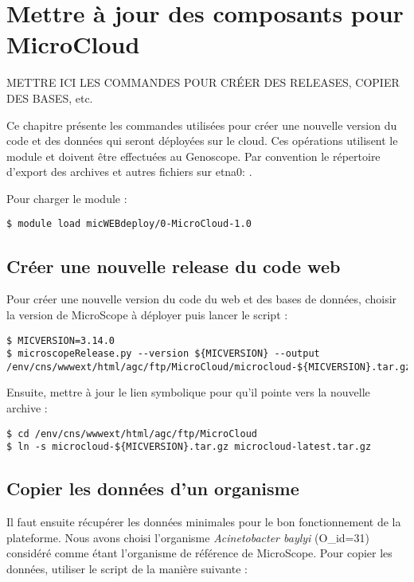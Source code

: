 \chapter{Mettre à jour des composants pour MicroCloud} \label{chap:creer_nouvelle_version}

\begin{mycolorbox}
    METTRE ICI LES COMMANDES POUR CRÉER DES RELEASES, COPIER DES BASES, etc.
\end{mycolorbox}

Ce chapitre présente les commandes utilisées pour créer une nouvelle version
du code et des données qui seront déployées sur le cloud.
Ces opérations utilisent le module \micWEBdeployVer
et doivent être effectuées au Genoscope.
Par convention le répertoire d'export des archives et autres fichiers sur etna0: .
\bigskip

Pour charger le module \micWEBdeployVer:
\begin{lstlisting}[style=bash]
$ module load micWEBdeploy/0-MicroCloud-1.0
\end{lstlisting}

\section{Créer une nouvelle release du code web}

Pour créer une nouvelle version du code du web et des bases de données, choisir la version de MicroScope à déployer puis lancer le script  :
\begin{lstlisting}[style=bash]
$ MICVERSION=3.14.0
$ microscopeRelease.py --version ${MICVERSION} --output /env/cns/wwwext/html/agc/ftp/MicroCloud/microcloud-${MICVERSION}.tar.gz
\end{lstlisting}

Ensuite, mettre à jour le lien symbolique pour qu'il pointe vers la nouvelle archive :
\begin{lstlisting}[style=bash]
$ cd /env/cns/wwwext/html/agc/ftp/MicroCloud
$ ln -s microcloud-${MICVERSION}.tar.gz microcloud-latest.tar.gz
\end{lstlisting}

\section{Copier les données d'un organisme}

Il faut ensuite récupérer les données minimales pour le bon fonctionnement de la plateforme. Nous avons choisi l'organisme \textit{Acinetobacter baylyi} (O\_id=31) considéré comme étant l'organisme de référence de MicroScope. Pour copier les données, utiliser le script  de la manière suivante :

